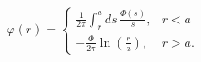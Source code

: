\begin{equation}
\label{Eq_0220}
\varphi(r) =
\begin{cases}
\displaystyle
\frac{1}{2\pi} \int^a_r ds \, \frac{\Phi(s)}{s},& r < a\\[3mm]
\displaystyle
- \frac{\Phi}{2\pi} \ln\left(\frac{r}{a}\right), & r > a.
\end{cases}
\end{equation}

